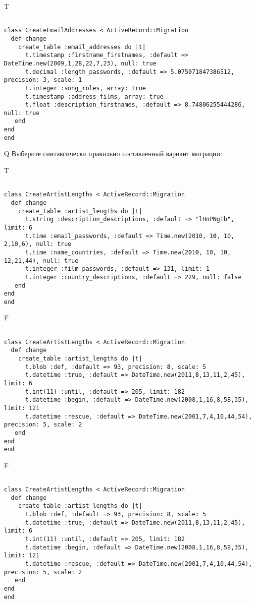 T
\begin{verbatim}
		
class CreateEmailAddresses < ActiveRecord::Migration 
  def change 
    create_table :email_addresses do |t| 
      t.timestamp :firstname_firstnames, :default => DateTime.new(2009,1,28,22,7,23), null: true
      t.decimal :length_passwords, :default => 5.075071847386512, precision: 3, scale: 1
      t.integer :song_roles, array: true
      t.timestamp :address_films, array: true
      t.float :description_firstnames, :default => 8.74806255444286, null: true
   end
end
end
\end{verbatim}

Q
Выберите синтаксически правильно составленный вариант миграции:

T
\begin{verbatim}
		
class CreateArtistLengths < ActiveRecord::Migration 
  def change 
    create_table :artist_lengths do |t| 
      t.string :description_descriptions, :default => "lHnPNgTb", limit: 6
      t.time :email_passwords, :default => Time.new(2010, 10, 10, 2,10,6), null: true
      t.time :name_countries, :default => Time.new(2010, 10, 10, 12,21,44), null: true
      t.integer :film_passwords, :default => 131, limit: 1
      t.integer :country_descriptions, :default => 229, null: false
   end
end
end
\end{verbatim}

F
\begin{verbatim}
		
class CreateArtistLengths < ActiveRecord::Migration 
  def change 
    create_table :artist_lengths do |t| 
      t.blob :def, :default => 93, precision: 8, scale: 5
      t.datetime :true, :default => DateTime.new(2011,8,13,11,2,45), limit: 6
      t.int(11) :until, :default => 205, limit: 182
      t.datetime :begin, :default => DateTime.new(2008,1,16,8,58,35), limit: 121
      t.datetime :rescue, :default => DateTime.new(2001,7,4,10,44,54), precision: 5, scale: 2
   end
end
end
\end{verbatim}

F
\begin{verbatim}
		
class CreateArtistLengths < ActiveRecord::Migration 
  def change 
    create_table :artist_lengths do |t| 
      t.blob :def, :default => 93, precision: 8, scale: 5
      t.datetime :true, :default => DateTime.new(2011,8,13,11,2,45), limit: 6
      t.int(11) :until, :default => 205, limit: 182
      t.datetime :begin, :default => DateTime.new(2008,1,16,8,58,35), limit: 121
      t.datetime :rescue, :default => DateTime.new(2001,7,4,10,44,54), precision: 5, scale: 2
   end
end
end
\end{verbatim}

